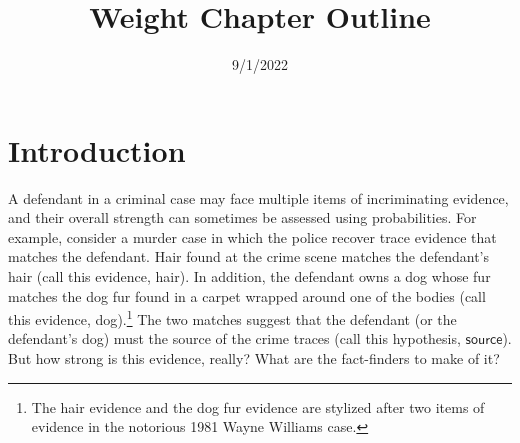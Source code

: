 \documentclass[
  10pt,
  dvipsnames,enabledeprecatedfontcommands]{scrartcl}
\title{Weight Chapter Outline}
\author{}
\date{\vspace{-2.5em}9/1/2022}
\begin{document}
\maketitle

{
\hypersetup{linkcolor=}
\setcounter{tocdepth}{2}
\tableofcontents
}
\hypertarget{introduction}{%
\section{Introduction}\label{introduction}}

A defendant in a criminal case may face multiple items of incriminating
evidence, and their overall strength can sometimes be assessed using
probabilities. For example, consider a murder case in which the police
recover trace evidence that matches the defendant. Hair found at the
crime scene matches the defendant's hair (call this evidence,
\textsf{hair}). In addition, the defendant owns a dog whose fur matches
the dog fur found in a carpet wrapped around one of the bodies (call
this evidence, \textsf{dog}).\footnote{The hair evidence and the dog fur
  evidence are stylized after two items of evidence in the notorious
  1981 Wayne Williams case.}
 The two matches suggest that the
defendant (or the defendant's dog) must the source of the crime traces
(call this hypothesis, \(\mathsf{source}\)). But how strong is this
evidence, really? What are the fact-finders to make of it?
\end{document}
